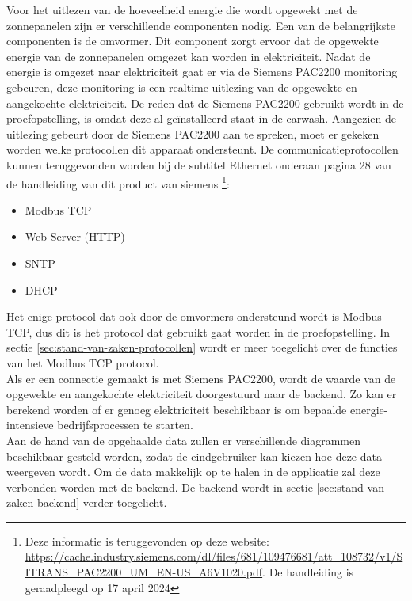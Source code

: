 Voor het uitlezen van de hoeveelheid energie die wordt opgewekt met de zonnepanelen zijn er verschillende componenten nodig. Een van de belangrijkste componenten is de omvormer. Dit component zorgt ervoor dat de opgewekte energie van de zonnepanelen omgezet kan worden in elektriciteit. Nadat de energie is omgezet naar elektriciteit gaat er via de Siemens PAC2200 monitoring gebeuren, deze monitoring is een realtime uitlezing van de opgewekte en aangekochte elektriciteit. De reden dat de Siemens PAC2200 gebruikt wordt in de proefopstelling, is omdat deze al geïnstalleerd staat in de carwash. Aangezien de uitlezing gebeurt door de Siemens PAC2200 aan te spreken, moet er gekeken worden welke protocollen dit apparaat ondersteunt. De communicatieprotocollen  kunnen teruggevonden worden bij de subtitel Ethernet onderaan pagina 28 van de handleiding van dit product van siemens \footnote{Deze informatie is teruggevonden op deze website: \url{https://cache.industry.siemens.com/dl/files/681/109476681/att_108732/v1/SITRANS_PAC2200_UM_EN-US_A6V1020.pdf}. De handleiding is geraadpleegd op 17 april 2024}:

\begin{itemize}
    \item Modbus TCP
    \item Web Server (HTTP)
    \item SNTP
    \item DHCP
\end{itemize}

Het enige protocol dat ook door de omvormers ondersteund wordt is Modbus TCP, dus dit is het protocol dat gebruikt gaat worden in de proefopstelling. In sectie \ref{sec:stand-van-zaken-protocollen} wordt er meer toegelicht over de functies van het Modbus TCP protocol.\\ 

Als er een connectie gemaakt is met Siemens PAC2200, wordt de waarde van de opgewekte en aangekochte elektriciteit doorgestuurd naar de backend. Zo kan er berekend worden of er genoeg elektriciteit beschikbaar is om bepaalde energie-intensieve bedrijfsprocessen te starten.\\

Aan de hand van de opgehaalde data zullen er verschillende diagrammen beschikbaar gesteld worden, zodat de eindgebruiker kan kiezen hoe deze data weergeven wordt. Om de data makkelijk op te halen in de applicatie zal deze verbonden worden met de backend. De backend wordt in sectie \ref{sec:stand-van-zaken-backend} verder toegelicht.

